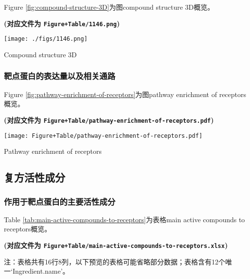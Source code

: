 \documentclass[
]{article}
\begin{document}
Figure \ref{fig:compound-structure-3D}为图compound structure 3D概览。

\textbf{(对应文件为 \texttt{Figure+Table/1146.png})}

\def\@captype{figure}
\begin{center}
\texttt{[image: ./figs/1146.png]}
\caption{Compound structure 3D}\label{fig:compound-structure-3D}
\end{center}

\hypertarget{ux9776ux70b9ux86cbux767dux7684ux8868ux8fbeux91cfux4ee5ux53caux76f8ux5173ux901aux8def}{%
\subsubsection{靶点蛋白的表达量以及相关通路}\label{ux9776ux70b9ux86cbux767dux7684ux8868ux8fbeux91cfux4ee5ux53caux76f8ux5173ux901aux8def}}

Figure \ref{fig:pathway-enrichment-of-receptors}为图pathway enrichment of receptors概览。

\textbf{(对应文件为 \texttt{Figure+Table/pathway-enrichment-of-receptors.pdf})}

\def\@captype{figure}
\begin{center}
\texttt{[image: Figure+Table/pathway-enrichment-of-receptors.pdf]}
\caption{Pathway enrichment of receptors}\label{fig:pathway-enrichment-of-receptors}
\end{center}

\hypertarget{ux590dux65b9ux6d3bux6027ux6210ux5206}{%
\subsection{复方活性成分}\label{ux590dux65b9ux6d3bux6027ux6210ux5206}}

\hypertarget{ux4f5cux7528ux4e8eux9776ux70b9ux86cbux767dux7684ux4e3bux8981ux6d3bux6027ux6210ux5206}{%
\subsubsection{作用于靶点蛋白的主要活性成分}\label{ux4f5cux7528ux4e8eux9776ux70b9ux86cbux767dux7684ux4e3bux8981ux6d3bux6027ux6210ux5206}}

Table \ref{tab:main-active-compounds-to-receptors}为表格main active compounds to receptors概览。

\textbf{(对应文件为 \texttt{Figure+Table/main-active-compounds-to-receptors.xlsx})}

\begin{center}\begin{tcolorbox}[colback=gray!10, colframe=gray!50, width=0.9\linewidth, arc=1mm, boxrule=0.5pt]注：表格共有16行8列，以下预览的表格可能省略部分数据；表格含有12个唯一`Ingredient.name'。
\end{tcolorbox}
\end{center}
\end{document}
